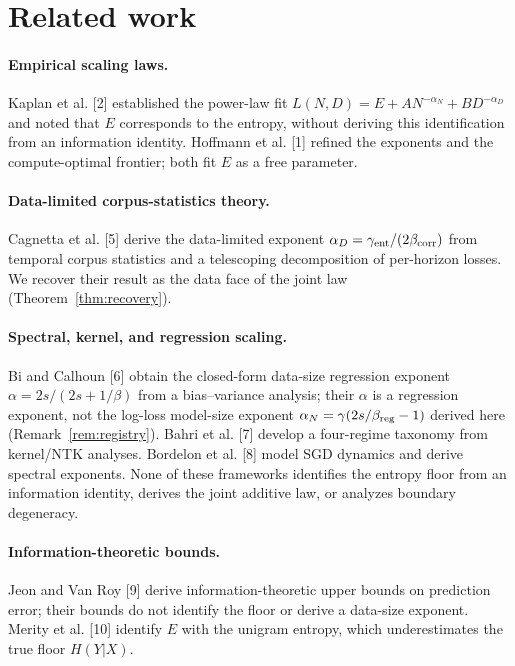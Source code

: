 \documentclass[12pt]{article}
\theoremstyle{remark}
\begin{document}
\section{Related work}
\label{sec:related}

\paragraph{Empirical scaling laws.}
Kaplan et al. [2] established the power-law fit
$L(N,D)=E+AN^{-\alpha_N}+BD^{-\alpha_D}$ and noted that $E$ corresponds to
the entropy, without deriving this identification from an information identity.
Hoffmann et al. [1] refined the exponents and the compute-optimal frontier;
both fit $E$ as a free parameter.

\paragraph{Data-limited corpus-statistics theory.}
Cagnetta et al. [5] derive the data-limited exponent
$\alpha_D=\gamma_{\rm ent}/(2\beta_{\rm corr})$ from temporal corpus statistics
and a telescoping decomposition of per-horizon losses. We recover their result
as the data face of the joint law (Theorem~\ref{thm:recovery}).

\paragraph{Spectral, kernel, and regression scaling.}
Bi and Calhoun [6] obtain the closed-form data-size regression exponent
$\alpha=2s/(2s+1/\beta)$ from a bias--variance analysis; their $\alpha$ is a
regression exponent, not the log-loss model-size exponent
$\alpha_N=\gamma(2s/\beta_{\rm reg}-1)$ derived here
(Remark~\ref{rem:registry}). Bahri et al. [7] develop a four-regime taxonomy
from kernel/NTK analyses. Bordelon et al. [8] model SGD dynamics and
derive spectral exponents. None of these frameworks identifies the entropy
floor from an information identity, derives the joint additive law, or
analyzes boundary degeneracy.

\paragraph{Information-theoretic bounds.}
Jeon and Van Roy [9] derive information-theoretic upper bounds on prediction
error; their bounds do not identify the floor or derive a data-size exponent.
Merity et al. [10] identify $E$ with the unigram entropy,
which underestimates the true floor $H(Y|X)$.
\end{document}
